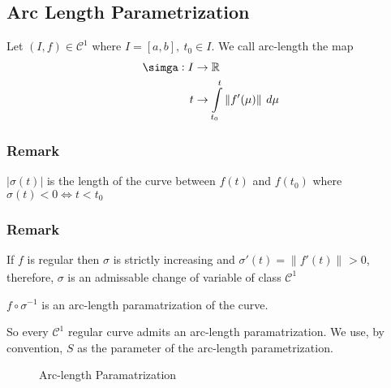 \subsection{Arc Length Parametrization}
\label{subsec:Arc Length Parametrization}
\begin{defn}[]
    Let $ \left( I,f\right) \in \mathscr{ C } ^1 $ where $ I = [a,b] ,\ t_0 \in I $. We
    call arc-length the map 
    \begin{align*}
        \simga: I &\to \mathbb{R}  \\
        t &\to \int\limits_{t_0}^{t} \| f'(\mu) \|^{ }_{ } \ d\mu \\ 
    \end{align*} 
    \label{def:}
\end{defn}
\subsubsection{Remark}
$ \left | \sigma(t) \right |  $ is the length of the curve between $ f(t)  $ and $ f(t_0)
$ where $ \sigma(t) < 0 \iff t<t_0 $
\subsubsection{Remark}
If $ f $ is regular then $ \sigma  $ is strictly increasing and $ \sigma'(t) = \| f'(t)
\|^{ }_{ } > 0 $, therefore, $ \sigma  $ is an admissable change of variable of class $
\mathscr{ C } ^1 $

\begin{defn}[]
    $ f\circ \sigma^{-1} $ is an arc-length paramatrization of the curve. 
    \label{def:}
\end{defn}
So every $ \mathscr{ C } ^1 $ regular curve admits an arc-length paramatrization.
We use, by convention, $ S $ as the parameter of the arc-length parametrization.

\begin{figure}[ht]
    \centering
    \caption{Arc-length Paramatrization}
    \label{fig:arc-length-paramatrization}
\end{figure}








